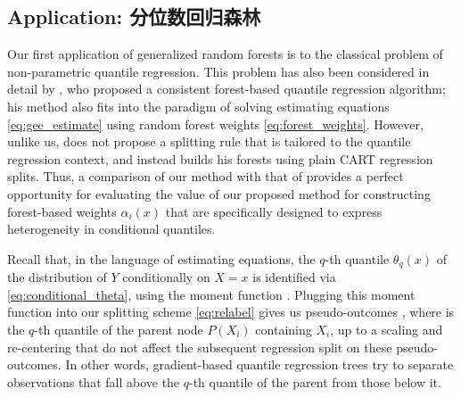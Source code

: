 \documentclass[aos]{imsart}
\theoremstyle{plain}
\theoremstyle{definition}
\theoremstyle{remark}
\begin{document}
\begin{CJK}{UTF8}{gbsn}
\section{Application: 分位数回归森林}
\label{sec:quantile}

Our first application of generalized random forests is to the classical problem of non-parametric quantile regression.
This problem has also been considered in detail by
\citet{meinshausen2006quantile}, who proposed a consistent forest-based quantile regression
algorithm; his method also fits into the paradigm of solving estimating equations \eqref{eq:gee_estimate}
using random forest weights \eqref{eq:forest_weights}. However, unlike us, \citet{meinshausen2006quantile}
does not propose a splitting rule that is tailored to the quantile regression context, and instead
builds his forests using plain CART regression splits. Thus, a comparison of our method with that of
\citet{meinshausen2006quantile} provides a perfect opportunity for evaluating the value of our
proposed method for constructing forest-based weights $\alpha_i(x)$ that are specifically designed
to express heterogeneity in conditional quantiles.

Recall that, in the language of estimating equations, the $q$-th quantile $\theta_q(x)$
of the distribution of $Y$ conditionally on $X = x$ is identified via \eqref{eq:conditional_theta}, 
using the moment function
.
Plugging this moment function into our splitting scheme \eqref{eq:relabel} gives us pseudo-outcomes
, where  is the $q$-th quantile of the parent node $P(X_i)$
containing $X_i$,
up to a scaling and re-centering that do not affect the subsequent regression split on these
pseudo-outcomes.
In other words, gradient-based quantile regression trees try to separate observations that
fall above the $q$-th quantile of the parent from those below it.


\end{CJK}
\end{document}
